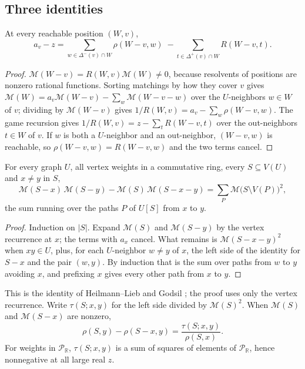 \documentclass[final]{siamart0516}
\numberwithin{theorem}{section}
\numberwithin{equation}{section}
\theoremstyle{siamnonum}
\theoremstyle{plain}
\newcommand{\RR}{\mathbb{R}}
\newcommand{\Puis}{\mathcal{P}_{\RR}}
\newcommand{\Mpot}{\mathcal{M}}           %
\begin{document}
\subsection{Three identities}

\begin{lemma}\label{lem:cavity}
At every reachable position $(W,v)$,
\[
a_v-z=\sum_{w\in\Delta^{-}(v)\cap W}\rho(W-v,w)\;-\sum_{t\in\Delta^{+}(v)\cap W}R(W-v,t).
\]
\end{lemma}
\begin{proof}
$\Mpot(W-v)=R(W,v)\Mpot(W)\neq0$, because resolvents of positions are nonzero rational functions. Sorting matchings by how they cover $v$ gives $\Mpot(W)=a_v\Mpot(W-v)-\sum_{w}\Mpot(W-v-w)$ over the $U$-neighbors $w\in W$ of $v$; dividing by $\Mpot(W-v)$ gives $1/R(W,v)=a_v-\sum_w\rho(W-v,w)$. The game recursion gives $1/R(W,v)=z-\sum_tR(W-v,t)$ over the out-neighbors $t\in W$ of $v$. If $w$ is both a $U$-neighbor and an out-neighbor, $(W-v,w)$ is reachable, so $\rho(W-v,w)=R(W-v,w)$ and the two terms cancel.
\end{proof}

\begin{lemma}\label{lem:two-point}
For every graph $U$, all vertex weights in a commutative ring, every $S\subseteq V(U)$ and $x\neq y$ in $S$,
\[
\Mpot(S-x)\,\Mpot(S-y)-\Mpot(S)\,\Mpot(S-x-y)=\sum_{P}\Mpot\bigl(S\setminus V(P)\bigr)^{2},
\]
the sum running over the paths $P$ of $U[S]$ from $x$ to $y$.
\end{lemma}
\begin{proof}
Induction on $|S|$. Expand $\Mpot(S)$ and $\Mpot(S-y)$ by the vertex recurrence at $x$; the terms with $a_x$ cancel. What remains is $\Mpot(S-x-y)^2$ when $xy\in U$, plus, for each $U$-neighbor $w\neq y$ of $x$, the left side of the identity for $S-x$ and the pair $(w,y)$. By induction that is the sum over paths from $w$ to $y$ avoiding $x$, and prefixing $x$ gives every other path from $x$ to $y$.
\end{proof}

This is the identity of Heilmann--Lieb and Godsil \cite{HeilmannLieb,GodsilBook}; the proof uses only the vertex recurrence. Write $\tau(S;x,y)$ for the left side divided by $\Mpot(S)^2$. When $\Mpot(S)$ and $\Mpot(S-x)$ are nonzero,
\begin{equation}\label{eq:green-difference}
\rho(S,y)-\rho(S-x,y)=\frac{\tau(S;x,y)}{\rho(S,x)}.
\end{equation}
For weights in $\Puis$, $\tau(S;x,y)$ is a sum of squares of elements of $\Puis$, hence nonnegative at all large real $z$.
\end{document}
